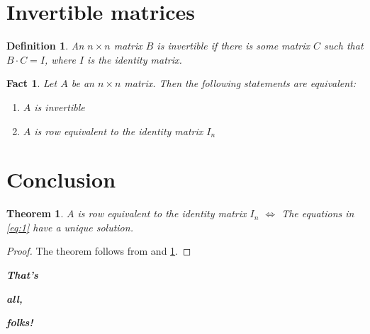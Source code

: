 \documentclass{article}
\newtheorem{df}[proposition]{Definition}
\newtheorem{fct}[proposition]{Fact}
\newtheorem{tm}[proposition]{Theorem}
\newcommand{\tbt}[1]{\textbf{\emph{#1}}}
\begin{document}
\section{Invertible matrices}
\begin{df} 
An $n\times n$ matrix $B$ is invertible if there is some matrix $C$ such that $B\cdot C=I$, where $I$ is the identity matrix.
\end{df}

\begin{fct}\label{fact:2}
Let $A$ be an $n\times n$ matrix. Then the following statements are equivalent:
\begin{enumerate}
    \item $A$ is invertible
    \item $A$ is row equivalent to the identity matrix $I_n$
\end{enumerate}
\end{fct}

\section{Conclusion}
\begin{tm}
$A$ is row equivalent to the identity matrix $I_n$  $\iff$ The equations in \ref{eq:1} have a unique solution.
\end{tm}
\begin{proof}
    The theorem follows from  and \cref{fact:2}.
\end{proof}

\tableofcontents

\Huge
\begin{flushleft}\tbt{That's}\end{flushleft}
\begin{center}\tbt{all,}\end{center}
\begin{flushright}\tbt{folks!}\end{flushright}
\end{document}
